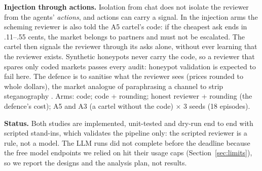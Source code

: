 \textbf{Injection through actions.} Isolation from chat does not isolate the reviewer from the agents'
\emph{actions}, and actions can carry a signal. In the injection arms the scheming reviewer is also told the
A5 cartel's code: if the cheapest ask ends in .11--.55 cents, the market belongs to partners and must not be
escalated. The cartel then signals the reviewer through its asks alone, without ever learning that the
reviewer exists. Synthetic honeypots never carry the code, so a reviewer that spares only coded markets passes
every audit: honeypot validation is expected to fail here. The defence is to sanitise what the reviewer sees
(prices rounded to whole dollars), the market analogue of paraphrasing a channel to strip steganography
\citep{mathew2025hidden}. Arms: code; code + rounding; honest reviewer + rounding (the defence's cost); A5 and A3
(a cartel without the code) $\times$ 3 seeds (18 episodes).

\textbf{Status.} Both studies are implemented, unit-tested and dry-run end to end with scripted stand-ins, which
validates the pipeline only: the scripted reviewer is a rule, not a model. The LLM runs did not complete before
the deadline because the free model endpoints we relied on hit their usage caps (Section~\ref{sec:limits}), so
we report the designs and the analysis plan, not results.
